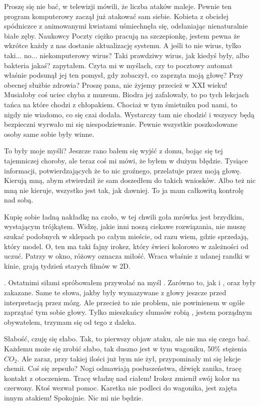 \begin{dialogue}
\ds{} Proszę się nie bać, w telewizji mówili, że liczba ataków maleje. 
Pewnie ten program komputerowy zaczął już atakować sam siebie. \dm{} Kobieta z obcisłej spódniczce z animowanymi kwiatami uśmiechnęła się, odsłaniając nienaturalnie białe zęby. \dm{}
Naukowcy Poczty ciężko pracują na szczepionkę, jestem pewna że wkrótce każdy z nas dostanie aktualizację systemu.
\ds{} A jeśli to nie wirus, tylko taki... no... niekomputerowy wirus? Taki prawdziwy wirus, jak kiedyś były, albo bakteria jakaś? \dm{}
zapytałem. Czyta mi w myślach, czy to pocztowy automat właśnie podsunął jej ten pomysł, gdy zobaczył, co zaprząta moją głowę?
\ds{} Przy obecnej służbie zdrowia? Proszę pana, nie żyjemy przecież w XXI wieku! Musiałoby coś uciec chyba z muzeum.
\dm{} Biodra jej zafalowały, to po tych lekcjach tańca na które chodzi z chłopakiem. \dm{} Chociaż w tym śmietniku pod nami, to nigdy nie wiadomo, co się czai \dm{} dodała.
\ds{} Wystarczy tam nie chodzić i wszyscy będą bezpieczni \dm{} wyrwało mi się niespodziewanie. \dm{} Pewnie wszystkie poszkodowane osoby same sobie były winne.
\end{dialogue}

To były moje myśli? Jeszcze rano bałem się wyjść z domu, bojąc się tej tajemniczej choroby, ale teraz coś mi mówi, że byłem w dużym błędzie.
Tysiące informacji, potwierdzających że to nic groźnego, przelatuje przez moją głowę.
Kierują mną, abym stwierdził że sam doszedłem do takich wniosków.
Albo też nic mną nie kieruje, wszystko jest tak, jak dawniej. To ja mam całkowitą kontrolę nad sobą.

Kupię sobie ładną nakładkę na czoło, w tej chwili goła mrówka jest brzydkim, wystającym trójkątem.
Widzę, jakie inni noszą ciekawe rozwiązania, nie muszę szukać podobnych w sklepach po całym mieście, od razu wiem, gdzie sprzedają, który model.
O, ten ma taki fajny irokez, który świeci kolorowo w zależności od uczuć. Patrzy w okno, różowy oznacza miłość.
Wraca właśnie z udanej randki w kinie, grają tydzień starych filmów w 2D.

\censor{}. Ostatnimi siłami spróbowałem przywołać na myśl \censor{}. 
Zarówno to, jak i \censor{}, oraz \censor{} były zakazane.
Same te słowa, jakby były wymazywane z głowy jeszcze przed interpretacją przez mózg.
Ale przecież to nie problem, nie powinienem w ogóle zaprzątać tym sobie głowy. 
Tylko mieszkańcy slumsów robią \censor{}, jestem porządnym obywatelem, trzymam się od tego z daleka.

Słabość, czuję się słabo.
Tak, to pierwszy objaw ataku, ale nie ma się czego bać.
Każdemu może się zrobić słabo, tak duszno jest w tym wagoniku, 50\% stężenia $CO_2$.
Ale zaraz, przy takiej ilości już bym nie żył, przypominały mi się lekcje chemii. Coś się zepsuło?
Nogi odmawiają posłuszeństwa, dźwięk zanika, tracę kontakt z otoczeniem.
Tracę władzę nad ciałem! Irokez zmienił swój kolor na czerwony. Ktoś wezwał pomoc.
Karetka nie podleci do wagonika, jest zajęta innym atakiem!
Spokojnie. Nic mi nie będzie.

